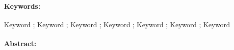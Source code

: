 \begin{small}
\vspace{-.25cm}
\paragraph*{Keywords:}  Keyword ; Keyword ; Keyword ; Keyword ;  Keyword ; Keyword ; Keyword 

\vspace{-.25cm}
\setlength{\columnsep}{12pt} %
\begin{multicols}{2}
\paragraph*{Abstract:}
\lipsum[1-5]


\end{multicols}
\end{small}
	
\newpage
\thispagestyle{empty}
\mbox{}
\newpage